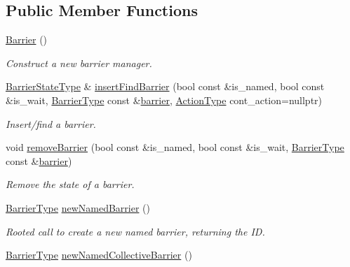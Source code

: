 \subsection*{Public Member Functions}
\begin{DoxyCompactItemize}
\item 
\hyperlink{structvt_1_1collective_1_1barrier_1_1_barrier_aa69e5135299fa366a2c59ac96a9f318d}{Barrier} ()
\begin{DoxyCompactList}\small\item\em Construct a new barrier manager. \end{DoxyCompactList}\item 
\hyperlink{structvt_1_1collective_1_1barrier_1_1_barrier_a9b612818f7b44ca65f2caee0dee094f3}{Barrier\+State\+Type} \& \hyperlink{structvt_1_1collective_1_1barrier_1_1_barrier_aa3f74f986e523701c1d85ed97d3ad5a4}{insert\+Find\+Barrier} (bool const \&is\+\_\+named, bool const \&is\+\_\+wait, \hyperlink{namespacevt_a25e481f0d6bbc7204db23d1c87a62e77}{Barrier\+Type} const \&\hyperlink{structvt_1_1collective_1_1barrier_1_1_barrier_a05124050c7d353a4f3475ee1875dd46a}{barrier}, \hyperlink{namespacevt_ae0a5a7b18cc99d7b732cb4d44f46b0f3}{Action\+Type} cont\+\_\+action=nullptr)
\begin{DoxyCompactList}\small\item\em Insert/find a barrier. \end{DoxyCompactList}\item 
void \hyperlink{structvt_1_1collective_1_1barrier_1_1_barrier_a56128065b0b7735958b998dd97a4938b}{remove\+Barrier} (bool const \&is\+\_\+named, bool const \&is\+\_\+wait, \hyperlink{namespacevt_a25e481f0d6bbc7204db23d1c87a62e77}{Barrier\+Type} const \&\hyperlink{structvt_1_1collective_1_1barrier_1_1_barrier_a05124050c7d353a4f3475ee1875dd46a}{barrier})
\begin{DoxyCompactList}\small\item\em Remove the state of a barrier. \end{DoxyCompactList}\item 
\hyperlink{namespacevt_a25e481f0d6bbc7204db23d1c87a62e77}{Barrier\+Type} \hyperlink{structvt_1_1collective_1_1barrier_1_1_barrier_a0d8e74149ddca96f06c1ff6071b73a74}{new\+Named\+Barrier} ()
\begin{DoxyCompactList}\small\item\em Rooted call to create a new named barrier, returning the ID. \end{DoxyCompactList}\item 
\hyperlink{namespacevt_a25e481f0d6bbc7204db23d1c87a62e77}{Barrier\+Type} \hyperlink{structvt_1_1collective_1_1barrier_1_1_barrier_a3e101519fbcfa9eee139bf02f991f085}{new\+Named\+Collective\+Barrier} ()

\end{DoxyCompactItemize}
